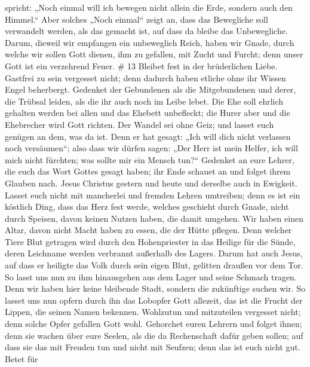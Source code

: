 spricht: „Noch einmal will ich bewegen nicht allein die Erde, sondern
auch den Himmel.``  Aber solches „Noch einmal`` zeigt an,
dass das Bewegliche soll verwandelt werden, als das gemacht ist, auf
dass da bleibe das Unbewegliche.  Darum, dieweil wir
empfangen ein unbeweglich Reich, haben wir Gnade, durch welche wir
sollen Gott dienen, ihm zu gefallen, mit Zucht und Furcht; 
denn unser Gott ist ein verzehrend Feuer. \# 13  Bleibet
fest in der brüderlichen Liebe.  Gastfrei zu sein vergesset
nicht; denn dadurch haben etliche ohne ihr Wissen Engel beherbergt.
 Gedenket der Gebundenen als die Mitgebundenen und derer,
die Trübsal leiden, als die ihr auch noch im Leibe lebet. 
Die Ehe soll ehrlich gehalten werden bei allen und das Ehebett
unbefleckt; die Hurer aber und die Ehebrecher wird Gott richten.
 Der Wandel sei ohne Geiz; und lasset euch genügen an dem,
was da ist. Denn er hat gesagt: „Ich will dich nicht verlassen noch
versäumen``;  also dass wir dürfen sagen: „Der Herr ist mein
Helfer, ich will mich nicht fürchten; was sollte mir ein Mensch tun?{}``
 Gedenket an eure Lehrer, die euch das Wort Gottes gesagt
haben; ihr Ende schauet an und folget ihrem Glauben nach. 
Jesus Christus gestern und heute und derselbe auch in Ewigkeit.
 Lasset euch nicht mit mancherlei und fremden Lehren
umtreiben; denn es ist ein köstlich Ding, dass das Herz fest werde,
welches geschieht durch Gnade, nicht durch Speisen, davon keinen Nutzen
haben, die damit umgehen.  Wir haben einen Altar, davon
nicht Macht haben zu essen, die der Hütte pflegen.  Denn
welcher Tiere Blut getragen wird durch den Hohenpriester in das Heilige
für die Sünde, deren Leichname werden verbrannt außerhalb des Lagers.
 Darum hat auch Jesus, auf dass er heiligte das Volk durch
sein eigen Blut, gelitten draußen vor dem Tor.  So lasst
uns nun zu ihm hinausgehen aus dem Lager und seine Schmach tragen.
 Denn wir haben hier keine bleibende Stadt, sondern die
zukünftige suchen wir.  So lasset uns nun opfern durch ihn
das Lobopfer Gott allezeit, das ist die Frucht der Lippen, die seinen
Namen bekennen.  Wohlzutun und mitzuteilen vergesset nicht;
denn solche Opfer gefallen Gott wohl.  Gehorchet euren
Lehrern und folget ihnen; denn sie wachen über eure Seelen, als die da
Rechenschaft dafür geben sollen; auf dass sie das mit Freuden tun und
nicht mit Seufzen; denn das ist euch nicht gut.  Betet für
